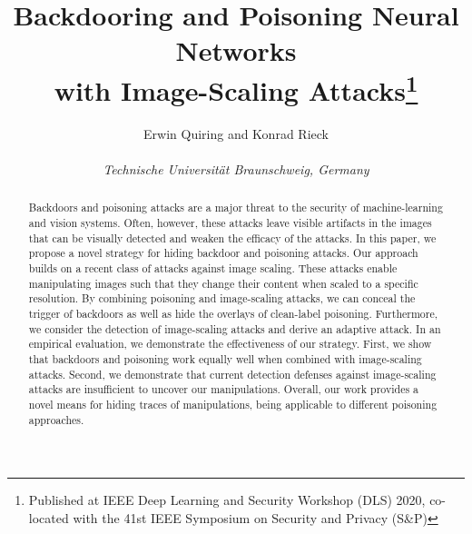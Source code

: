 \documentclass[conference]{IEEEtran}
\begin{document}
\title{Backdooring and Poisoning Neural Networks\\with 
	Image-Scaling Attacks\thanks{Published at {IEEE} Deep Learning and
		Security Workshop (DLS) 2020, co-located with the 41st {IEEE} 
		Symposium on Security and Privacy (S\&P)}}

\author{
	{\rm Erwin Quiring and 
		Konrad Rieck}\\[1mm]
	\begin{minipage}{8cm} 
		\centering \it
		Technische Universit\"at Braunschweig, Germany
	\end{minipage} 	  %
}

\maketitle



\begin{abstract}
Backdoors and poisoning attacks are a major threat to the security of 
machine-learning and vision systems. Often, however, these attacks 
leave visible artifacts in the images that can be visually detected and 
weaken the efficacy of the attacks.  In this paper, we propose a novel 
strategy for hiding backdoor and poisoning attacks. Our approach builds 
on a recent class of attacks against image scaling. These attacks 
enable manipulating images such that they change their content when 
scaled to a specific resolution. By combining poisoning and 
image-scaling attacks, we can conceal the trigger of backdoors as well 
as hide the overlays of clean-label poisoning. Furthermore, we consider 
the detection of image-scaling attacks and derive an adaptive attack. 
In an empirical evaluation, we demonstrate the effectiveness of our 
strategy.  First, we show that backdoors and poisoning work equally 
well when combined with image-scaling attacks. Second, we demonstrate 
that current detection defenses against image-scaling attacks are 
insufficient to uncover our manipulations. Overall, our work provides a 
novel means for hiding traces of manipulations, being applicable to 
different poisoning approaches.
\end{abstract}

\vspace{0.2cm}
\end{document}
